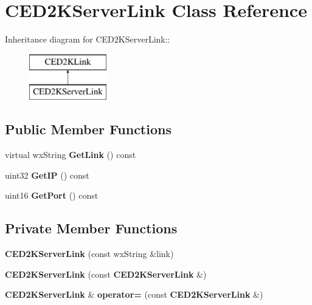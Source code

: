 \section{CED2KServerLink Class Reference}
\label{classCED2KServerLink}
Inheritance diagram for CED2KServerLink::\begin{figure}[H]
\begin{center}
\leavevmode
\includegraphics[height=2cm]{classCED2KServerLink}
\end{center}
\end{figure}
\subsection*{Public Member Functions}
\begin{DoxyCompactItemize}
\item 
virtual wxString {\bfseries GetLink} () const \label{classCED2KServerLink_af6c1defced8187433813881b18edc7e8}

\item 
uint32 {\bfseries GetIP} () const \label{classCED2KServerLink_a5cfacf3dffa124c068837ff310b9df14}

\item 
uint16 {\bfseries GetPort} () const \label{classCED2KServerLink_a756bea826ce77ee1efaa016623f08d8c}

\end{DoxyCompactItemize}
\subsection*{Private Member Functions}
\begin{DoxyCompactItemize}
\item 
{\bfseries CED2KServerLink} (const wxString \&link)\label{classCED2KServerLink_a0b07dc0da55a55b5d6492c9f4f7bdcd8}

\item 
{\bfseries CED2KServerLink} (const {\bf CED2KServerLink} \&)\label{classCED2KServerLink_a305664fcaacf96d5f7f62a4ff706750d}

\item 
{\bf CED2KServerLink} \& {\bfseries operator=} (const {\bf CED2KServerLink} \&)\label{classCED2KServerLink_a79c1d4ba6d65ad421bc6be430e159771}

\end{DoxyCompactItemize}
